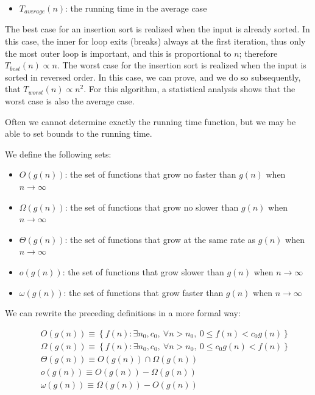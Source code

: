 \documentclass[justified,sixbynine]{tufte-book}
\theoremstyle{plain}%
\theoremstyle{definition}
\theoremstyle{remark}
\begin{document}
\begin{fullwidth}
\begin{itemize}
\item  $T_{average}(n)$: the running time in the average case
\end{itemize}

The best case for an insertion sort is realized when the input is already sorted. In this case, the inner for loop exits (breaks) always at the first iteration, thus only the most outer loop is important, and this is proportional to $n$; therefore $T_{best}(n) \propto n$. The worst case for the insertion sort is realized when the input is sorted in reversed order. In this case, we can prove, and we do so subsequently, that $T_{worst}(n) \propto n^2$. For this algorithm, a statistical analysis shows that the worst case is also the average case.

Often we cannot determine exactly the running time function, but we may be able to set bounds to the running time.

We define the following sets:

\begin{itemize}
\item  $O(g(n))$: the set of functions that grow no faster than $g(n)$ when $%
n\rightarrow \infty $

\item  $\Omega (g(n))$: the set of functions that grow no slower than $g(n)$ when $%
n\rightarrow \infty $

\item  $\Theta (g(n))$: the set of functions that grow at the same rate as $g(n)$ when $%
n\rightarrow \infty $

\item  $o(g(n))$: the set of functions that grow slower than $g(n)$ when $n\rightarrow
\infty $

\item  $\omega (g(n))$: the set of functions that grow faster than $g(n)$ when $n\rightarrow \infty $
\end{itemize}

We can rewrite the preceding definitions in a more formal way:

\begin{eqnarray}
&&O(g(n))\equiv \left\{ f(n):\exists n_0,c_0,\ \forall n>n_0,\
0\leq f(n)<c_0g(n)\right\} \\
&&\Omega (g(n))\equiv \left\{ f(n):\exists n_0,c_0,\ \forall
n>n_0,\ 0\leq c_0g(n)<f(n)\right\} \\
&&\Theta (g(n))\equiv O(g(n))\cap \Omega (g(n)) \\
&&o(g(n))\equiv O(g(n))-\Omega (g(n)) \\
&&\omega (g(n))\equiv \Omega (g(n))-O(g(n))
\end{eqnarray}


\end{fullwidth}
\end{document}
